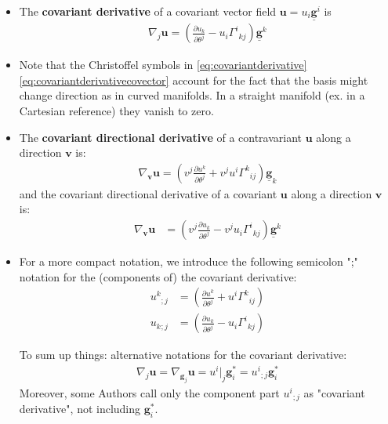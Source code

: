 \documentclass{digitaldynamics}
\def\vect#1{\bm{#1}}
\def\vcovar#1{{\bm{#1}}^*}
\def\vcontr#1{\underline{\bm{#1}}}
\begin{document}
\begin{itemize}
	\item The \textbf{covariant derivative} of a covariant vector field $\vect{u} = u_i \vcontr{g}^i$ is 
	\begin{align}
	  \nabla_{j} \vect{u} = \left(\frac{\partial u_k}{\partial \theta^j} - u_i {\Gamma^i}_{k j} \right) \vcontr{g}^k
	\label{eq:covariantderivativecovector}
	\end{align}
	
	\item Note that the Christoffel symbols in \eqref{eq:covariantderivative} \eqref{eq:covariantderivativecovector} account
	for the fact that the basis might change direction as in curved manifolds. In a straight manifold (ex. in a Cartesian reference) they vanish to zero.
	
	\item The \textbf{covariant directional derivative} of a contravariant $\vect{u}$ along a direction $\vect{v}$ is:
	\begin{align}
	  \nabla_{\vect{v}} \vect{u} = \left( v^j \frac{\partial u^k}{\partial \theta^j} + v^j u^i {\Gamma^k}_{i j} \right) \vcontr{g}_k
	\label{eq:directionalderivative}
	\end{align}
	and the covariant directional derivative of a covariant $\vect{u}$ along a direction $\vect{v}$ is:
	\begin{align}
	  \nabla_{\vect{v}} \vect{u} &= \left( v^j \frac{\partial u_k}{\partial \theta^j} - v^j u_i {\Gamma^i}_{k j} \right) \vcontr{g}^k
	\label{eq:directionalderivativecovector}
	\end{align}
	
	
	
	
	
	\item For a more compact notation, we introduce the following semicolon ";" notation for the (components of) the covariant derivative:
	\begin{align}
	   u^k{}_{;j} &= \left(\frac{\partial u^k}{\partial \theta^j} + u^i {\Gamma^k}_{i j} \right) \\
		 u_k{}_{;j} &= \left(\frac{\partial u_k}{\partial \theta^j} - u_i {\Gamma^i}_{k j} \right)
	\end{align}
	
	
	To sum up things: alternative notations for the covariant derivative:
	\begin{align}
	  \nabla_j \vect{u} = \nabla_{\vect{g}_j} \vect{u} = u^i|_j \vcovar{g}_i = u^i{}_{;j} \vcovar{g}_i
	\label{eq:covariantderivative3}
	\end{align}
	Moreover, some Authors call only the component part $u^i{}_{;j}$ as "covariant derivative", not including $\vcovar{g}_i$.
	

\end{itemize}
\end{document}
